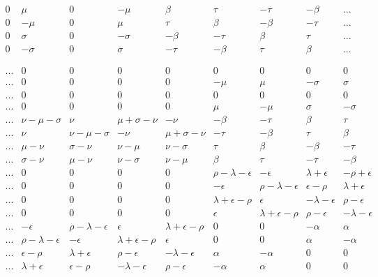 \documentclass[12pt]{article}
\begin{document}
\begin{displaymath}
\begin{array}{ccccccccc}
 0 & \mu & 0 & -\mu &  \beta & \tau & -\tau & -\beta & ... \\
 0 & -\mu & 0 & \mu &  \tau & \beta & -\beta & -\tau &  ... \\
 0 & \sigma & 0 & -\sigma &  -\beta & -\tau & \beta & \tau & ... \\
 0 & -\sigma & 0 & \sigma &  -\tau & -\beta & \tau & \beta & ... \\
& & & & & & & & \\
& & & & & & & & \\
 ... &  0 & 0 & 0 & 0 &  0 & 0 & 0 & 0 \\
 ... & 0 & 0 & 0 & 0 &  -\mu & \mu & -\sigma & \sigma \\
 ... & 0 & 0 & 0 & 0 &  0 & 0 & 0 & 0 \\
 ... & 0 & 0 & 0 & 0 &  \mu & -\mu & \sigma & -\sigma \\
 ... & \nu-\mu-\sigma & \nu & \mu+\sigma-\nu & -\nu &  -\beta & -\tau & \beta & \tau \\
 ... & \nu & \nu-\mu-\sigma & -\nu & \mu+\sigma-\nu &  -\tau & -\beta & \tau & \beta \\
 ... & \mu-\nu & \sigma-\nu & \nu-\mu & \nu-\sigma &  \tau & \beta & -\beta & -\tau \\
 ... & \sigma-\nu & \mu-\nu & \nu-\sigma & \nu-\mu &  \beta & \tau & -\tau & -\beta \\
 ... & 0 & 0 & 0 & 0 &  \rho-\lambda-\epsilon & -\epsilon & \lambda+\epsilon & -\rho+\epsilon \\
 ... & 0 & 0 & 0 & 0 &  -\epsilon & \rho-\lambda-\epsilon & \epsilon-\rho & \lambda+\epsilon \\
 ... & 0 & 0 & 0 & 0 &  \lambda+\epsilon-\rho & \epsilon & -\lambda-\epsilon & \rho-\epsilon \\
 ... & 0 & 0 & 0 & 0 &  \epsilon & \lambda+\epsilon-\rho & \rho-\epsilon & -\lambda-\epsilon \\
 ... & -\epsilon & \rho-\lambda-\epsilon & \epsilon & \lambda+\epsilon-\rho &  0 & 0 & -\alpha & \alpha \\
 ... & \rho-\lambda-\epsilon & -\epsilon & \lambda+\epsilon-\rho & \epsilon &  0 & 0 & \alpha & -\alpha \\
 ... & \epsilon-\rho & \lambda+\epsilon & \rho-\epsilon & -\lambda-\epsilon &  \alpha & -\alpha & 0 & 0 \\
 ... & \lambda+\epsilon & \epsilon-\rho & -\lambda-\epsilon & \rho-\epsilon &  -\alpha & \alpha & 0 & 0 

\end{array}
\end{displaymath}
\end{document}
